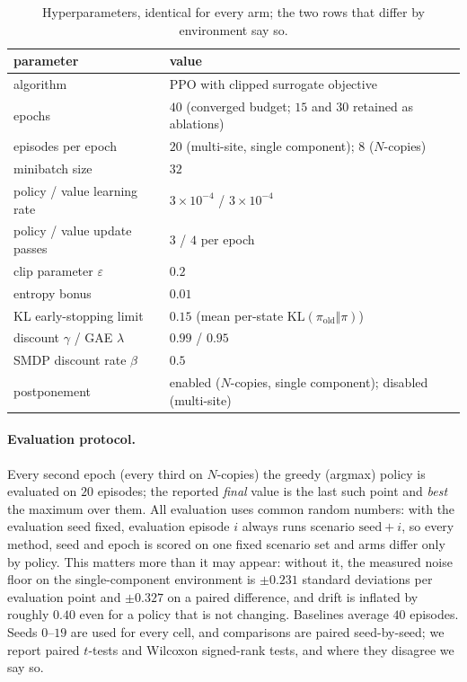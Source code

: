 \documentclass[review,authoryear,3p,times]{elsarticle}
\begin{document}
\begin{table}[tbp]
\centering
\caption{Hyperparameters, identical for every arm; the two rows that differ by
environment say so.}
\label{tab:hyper}
\small
\begin{tabular}{ll}
\toprule
parameter & value \\
\midrule
algorithm & PPO with clipped surrogate objective \\
epochs & $40$ (converged budget; $15$ and $30$ retained as ablations) \\
episodes per epoch & $20$ (multi-site, single component); $8$ ($N$-copies) \\
minibatch size & $32$ \\
policy / value learning rate & $3\times10^{-4}$ / $3\times10^{-4}$ \\
policy / value update passes & $3$ / $4$ per epoch \\
clip parameter $\varepsilon$ & $0.2$ \\
entropy bonus & $0.01$ \\
KL early-stopping limit & $0.15$ (mean per-state $\mathrm{KL}(\pi_{\mathrm{old}}\Vert\pi)$) \\
discount $\gamma$ / GAE $\lambda$ & $0.99$ / $0.95$ \\
SMDP discount rate $\beta$ & $0.5$ \\
postponement & enabled ($N$-copies, single component); disabled (multi-site) \\
\bottomrule
\end{tabular}
\end{table}

\paragraph{Evaluation protocol.} Every second epoch (every third on
$N$-copies) the greedy (argmax) policy is evaluated on $20$ episodes; the reported \emph{final} value is the last such
point and \emph{best} the maximum over them. All evaluation uses common random
numbers: with the evaluation seed fixed, evaluation episode $i$ always runs
scenario $\mathrm{seed}+i$, so every method, seed and epoch is scored on one
fixed scenario set and arms differ only by policy. This matters more than it
may appear: without it, the measured noise floor on the single-component
environment is $\pm0.231$ standard deviations per evaluation point and
$\pm0.327$ on a paired difference, and drift is inflated by roughly $0.40$ even
for a policy that is not changing. Baselines average $40$ episodes. Seeds
$0$--$19$ are used for every cell, and comparisons are paired seed-by-seed;
we report paired $t$-tests and Wilcoxon signed-rank tests, and where they
disagree we say so.
\end{document}
